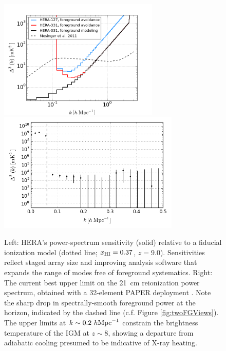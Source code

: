 \documentclass[preprint]{aastex}
\newcommand{\Mycitep}[1]{{\bf \citep{#1}}}
\newcommand{\Caption}[4]{\vspace{#1}\renewcommand{\baselinestretch}{#2}\caption{#4}\vspace{#3}}
\def\HI{{H{\small I }}}
\def\xHI{{x_{\rm\HI}}}
\begin{document}
\begin{figure}[t]\centering
\includegraphics[height=2.25in]{plots/Pspec/eor_pspec_2014.png}
\includegraphics[height=2.25in]{plots/Pspec/pk_k3pk.png} 
\Caption{-0.1in}{0.99}{-0.2in}{\small Left: HERA's power-spectrum sensitivity (solid)
relative to a fiducial ionization model (dotted line; $\xHI=0.37$, $z=9.0$).
Sensitivities reflect staged array size and
improving analysis software that expands the range
of modes free of foreground systematics.
Right: The current best upper limit on the 21~cm reionization power spectrum,
obtained with a 32-element PAPER deployment \Mycitep{parsons_et_al2013}.  Note the sharp drop in spectrally-smooth foreground power at the horizon, indicated by the dashed line (c.f. Figure \ref{fig:twoFGViews}).  The upper limits at $k\sim0.2~h\rm{Mpc}^{-1}$
constrain the brightness temperature of the IGM at $z\sim8$, showing
a departure from adiabatic cooling presumed to be indicative of X-ray heating.
}\label{fig:eor_pspec}
\end{figure}


\end{document}
